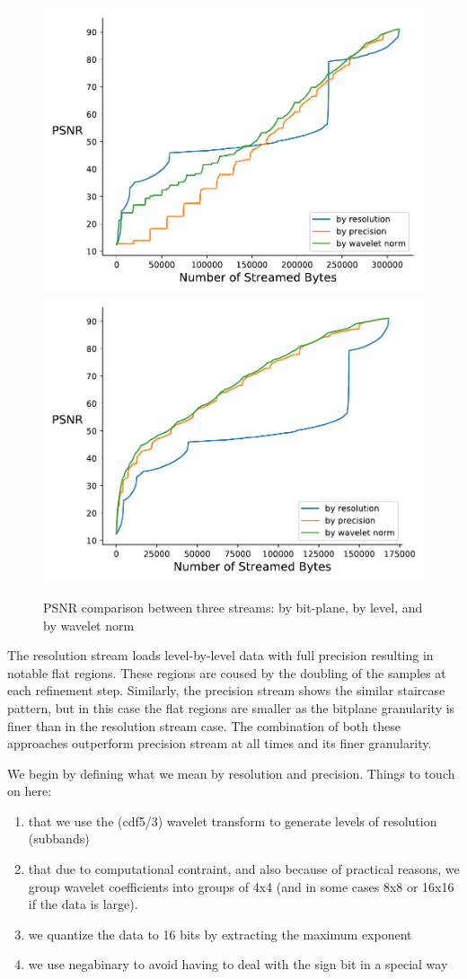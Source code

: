 \begin{figure}[htb!]
	\centering
	{\includegraphics[width=0.4\linewidth]{img/independent/rmse-miranda-viscosity}}
	{\includegraphics[width=0.4\linewidth]{img/skip-zeros/rmse-miranda-viscosity}}
	\caption {PSNR comparison between three streams: by bit-plane, by level, and by wavelet norm}
	\label{fig:psnr_traditional_vs_by_norm_viscosity}
\end{figure}



The resolution stream loads level-by-level data with full precision resulting in notable flat regions. These
regions are coused by the doubling of the samples at each refinement step. Similarly, the precision stream
shows the similar staircase pattern, but in this case the flat regions are smaller as the bitplane granularity
is finer than in the resolution stream case. The combination of both these approaches outperform precision
stream at all times and its finer granularity.

We begin by defining what we mean by resolution and precision. Things to touch on here:

\begin{enumerate}
  \item that we use the (cdf5/3) wavelet transform to generate levels of resolution (subbands)
  \item that due to computational contraint, and also because of practical reasons, we group wavelet coefficients into groups of 4x4 (and in some cases 8x8 or 16x16 if the data is large).
  \item we quantize the data to 16 bits by extracting the maximum exponent
  \item we use negabinary to avoid having to deal with the sign bit in a special way
\end{enumerate}

